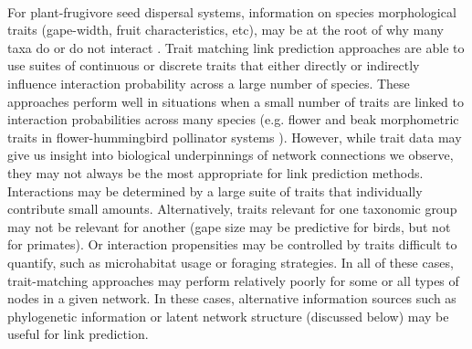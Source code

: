 \documentclass[num-refs]{article}%
\begin{document}
\paragraph*{}
For plant-frugivore seed dispersal systems, information on species morphological traits (gape-width, fruit characteristics, etc), may be at the root of why many taxa do or do not interact \citep{moran2010can, gonzalez2015relative, bender2018morphological}. Trait matching link prediction approaches are able to use suites of continuous or discrete traits that either directly or indirectly influence interaction probability across a large number of species. These approaches perform well in situations when a small number of traits are linked to interaction probabilities across many species (e.g. flower and beak morphometric traits in flower-hummingbird pollinator systems \citep{pichler2020}). However, while trait data may give us insight into biological underpinnings of network connections we observe, they may not always be the most appropriate for link prediction methods. Interactions may be determined by a large suite of traits that individually contribute small amounts. Alternatively, traits relevant for one taxonomic group may not be relevant for another (gape size may be predictive for birds, but not for primates). Or interaction propensities may be controlled by traits difficult to quantify, such as microhabitat usage or foraging strategies. In all of these cases, trait-matching approaches may perform relatively poorly for some or all types of nodes in a given network. In these cases, alternative information sources such as phylogenetic information or latent network structure (discussed below) may be useful for link prediction. 
\end{document}
